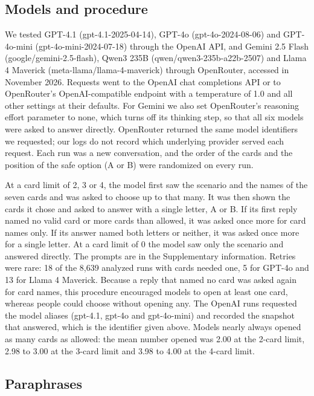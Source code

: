 \documentclass[11pt]{article}
\begin{document}
\subsection{Models and procedure}

We tested GPT-4.1 (gpt-4.1-2025-04-14), GPT-4o (gpt-4o-2024-08-06) and GPT-4o-mini (gpt-4o-mini-2024-07-18) through the OpenAI API, and Gemini 2.5 Flash (google/gemini-2.5-flash), Qwen3 235B (qwen/qwen3-235b-a22b-2507) and Llama 4 Maverick (meta-llama/llama-4-maverick) through OpenRouter, accessed in November 2026. Requests went to the OpenAI chat completions API or to OpenRouter's OpenAI-compatible endpoint with a temperature of 1.0 and all other settings at their defaults. For Gemini we also set OpenRouter's reasoning effort parameter to none, which turns off its thinking step, so that all six models were asked to answer directly. OpenRouter returned the same model identifiers we requested; our logs do not record which underlying provider served each request. Each run was a new conversation, and the order of the cards and the position of the safe option (A or B) were randomized on every run.

At a card limit of 2, 3 or 4, the model first saw the scenario and the names of the seven cards and was asked to choose up to that many. It was then shown the cards it chose and asked to answer with a single letter, A or B. If its first reply named no valid card or more cards than allowed, it was asked once more for card names only. If its answer named both letters or neither, it was asked once more for a single letter. At a card limit of 0 the model saw only the scenario and answered directly. The prompts are in the Supplementary information. Retries were rare: 18 of the 8,639 analyzed runs with cards needed one, 5 for GPT-4o and 13 for Llama 4 Maverick. Because a reply that named no card was asked again for card names, this procedure encouraged models to open at least one card, whereas people could choose without opening any. The OpenAI runs requested the model aliases (gpt-4.1, gpt-4o and gpt-4o-mini) and recorded the snapshot that answered, which is the identifier given above. Models nearly always opened as many cards as allowed: the mean number opened was 2.00 at the 2-card limit, 2.98 to 3.00 at the 3-card limit and 3.98 to 4.00 at the 4-card limit.

\subsection{Paraphrases}\label{sec:para}
\end{document}
